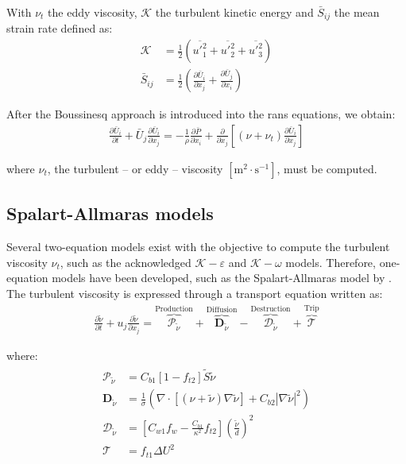 \documentclass[12pt,twoside]{report}
\renewcommand \pd[2] { \frac{\partial {#1} } {\partial {#2}} }
\newcommand{\keps}{$\mathcal{K}-\varepsilon$ }
\newcommand{\kom}{$\mathcal{K}-\omega$ }
\begin{document}
With $\nu_t$ the eddy viscosity, $\mathcal{K}$ the turbulent kinetic energy and $\bar{S}_{ij}$ the mean strain rate defined as:
\begin{align}
    \mathcal{K} &= \frac{1}{2} \left( \overline{u'_1^2}+ \overline{u'_2^2}+ \overline{u'_3^2} \right) \\
    \bar{S}_{ij} &= \frac{1}{2} \left( \pd{\bar{U}_i}{x_j} + \pd{\bar{U}_j}{x_i} \right)
\end{align}

After the Boussinesq approach is introduced into the \gls{rans} equations, we obtain:
\begin{align}
    \pd{\bar{U}_i}{t} + \bar{U}_j \pd{\bar{U}_i}{x_j} = -\frac{1}{\rho} \pd{\bar{P}}{x_i} + \pd{}{x_j} \left[ \left(  \nu + \nu_t  \right) \pd{\bar{U}_i}{x_j} \right]
\end{align}

where $\nu_t$, the turbulent -- or eddy -- viscosity $[\text{m}^2 \cdot \text{s}^{-1}]$, must be computed.



\subsection{Spalart-Allmaras models}
Several two-equation models exist with the objective to compute the turbulent viscosity $\nu_t$, such as the acknowledged \keps and \kom models. Therefore, one-equation models have been developed, such as the Spalart-Allmaras model by \cite{spalart_one-equation_1992}. The turbulent viscosity is expressed through a transport equation written as:
\begin{align}
   \pd{\tilde{\nu}}{t} + u_j\pd{\tilde{\nu}}{x_j}= \overbrace{\mathcal{P}_{\tilde{\nu}}}^{\text{Production}} + \overbrace{\mathbf{D}_{\tilde{\nu}}}^{\text{Diffusion}} -\overbrace{\mathcal{D}_{\tilde{\nu}}}^{\text{Destruction}} +\overbrace{\mathcal{T}}^{\text{Trip}} \label{eq:SA_one-equation model}
\end{align}

where:
\begin{align}
    \begin{split}
        \mathcal{P}_{\tilde{\nu}} &= C_{b1}[1-f_{t2}]{\tilde {S}}{\tilde {\nu }} \\
        \mathbf{D}_{\tilde{\nu}} &= {\frac {1}{\sigma }}\left(\nabla \cdot [(\nu +{\tilde {\nu }})\nabla {\tilde {\nu }}]+C_{b2}|\nabla {\tilde {\nu}}|^{2}\right) \\
        \mathcal{D}_{\tilde{\nu}} &= \left[C_{w1}f_{w}-{\frac {C_{b1}}{\kappa ^{2}}}f_{t2}\right]\left({\frac {\tilde {\nu }}{d}}\right)^{2} \\
        \mathcal{T} &= f_{t1}\Delta U^{2}
    \end{split}
\end{align}
\end{document}
